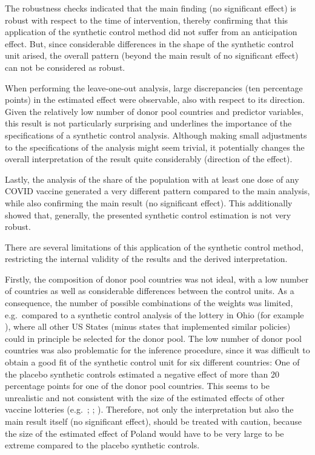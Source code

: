 \documentclass{scrbook}
\begin{document}
The robustness checks indicated that the main finding (no significant
effect) is robust with respect to the time of intervention, thereby
confirming that this application of the synthetic control method did not
suffer from an anticipation effect. But, since considerable differences
in the shape of the synthetic control unit arised, the overall pattern
(beyond the main result of no significant effect) can not be considered
as robust.

When performing the leave-one-out analysis, large discrepancies (ten
percentage points) in the estimated effect were observable, also with
respect to its direction. Given the relatively low number of donor pool
countries and predictor variables, this result is not particularly
surprising and underlines the importance of the specifications of a
synthetic control analysis. Although making small adjustments to the
specifications of the analysis might seem trivial, it potentially
changes the overall interpretation of the result quite considerably
(direction of the effect).

Lastly, the analysis of the share of the population with at least one
dose of any COVID vaccine generated a very different pattern compared to
the main analysis, while also confirming the main result (no significant
effect). This additionally showed that, generally, the presented
synthetic control estimation is not very robust.

There are several limitations of this application of the synthetic
control method, restricting the internal validity of the results and the
derived interpretation.

Firstly, the composition of donor pool countries was not ideal, with a
low number of countries as well as considerable differences between the
control units. As a consequence, the number of possible combinations of
the weights was limited, e.g.~compared to a synthetic control analysis
of the lottery in Ohio (for example \textcite{barber_conditional_2022}),
where all other US States (minus states that implemented similar
policies) could in principle be selected for the donor pool. The low
number of donor pool countries was also problematic for the inference
procedure, since it was difficult to obtain a good fit of the synthetic
control unit for six different countries: One of the placebo synthetic
controls estimated a negative effect of more than 20 percentage points
for one of the donor pool countries. This seems to be unrealistic and
not consistent with the size of the estimated effects of other vaccine
lotteries (e.g.~\cite{robertson_are_2021};
\cite{acharya_implementation_2021}; \cite{fuller_assessing_2022}).
Therefore, not only the interpretation but also the main result itself
(no significant effect), should be treated with caution, because the
size of the estimated effect of Poland would have to be very large to be
extreme compared to the placebo synthetic controls.
\end{document}
